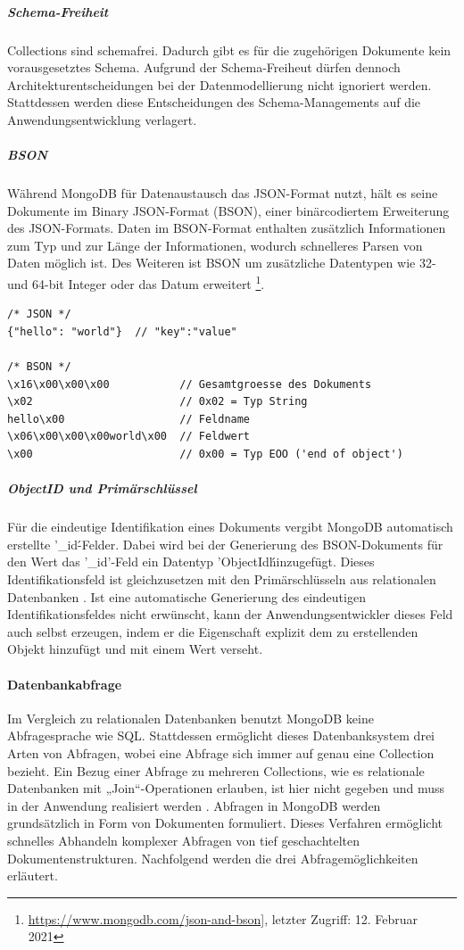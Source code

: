 \noindent
\subparagraph{Schema-Freiheit}
Collections sind schemafrei. Dadurch gibt es für die zugehörigen Dokumente kein vorausgesetztes Schema. Aufgrund der Schema-Freiheut dürfen dennoch Architekturentscheidungen bei der Datenmodellierung nicht ignoriert werden. Stattdessen werden diese Entscheidungen des Schema-Managements auf die Anwendungsentwicklung verlagert.
\newline

\noindent
\subparagraph{BSON}
Während MongoDB für Datenaustausch das JSON-Format nutzt, hält es seine Dokumente im Binary JSON-Format (BSON), einer binärcodiertem Erweiterung des JSON-Formats. Daten im BSON-Format enthalten zusätzlich Informationen zum Typ und zur Länge der Informationen, wodurch schnelleres Parsen von Daten möglich ist. Des Weiteren ist BSON um zusätzliche Datentypen wie 32- und 64-bit Integer oder das Datum erweitert \footnote{\url{https://www.mongodb.com/json-and-bson]}, letzter Zugriff: 12. Februar 2021}.
\newline

\begin{lstlisting}[caption=JSON - BSON Vergleich, label=lst:JSONBSON]
/* JSON */
{"hello": "world"}  // "key":"value"

/* BSON */
\x16\x00\x00\x00           // Gesamtgroesse des Dokuments
\x02                       // 0x02 = Typ String
hello\x00                  // Feldname
\x06\x00\x00\x00world\x00  // Feldwert
\x00                       // 0x00 = Typ EOO ('end of object')
\end{lstlisting}


\noindent
\subparagraph{ObjectID und Primärschlüssel}
Für die eindeutige Identifikation eines Dokuments vergibt MongoDB automatisch erstellte '\_id\'-Felder. Dabei wird bei der Generierung des BSON-Dokuments für den Wert das '\_id'-Feld ein Datentyp 'ObjectId\'  hinzugefügt. Dieses Identifikationsfeld ist gleichzusetzen mit den Primärschlüsseln aus relationalen Datenbanken \cite{DB1.85}. Ist eine automatische Generierung des eindeutigen Identifikationsfeldes nicht erwünscht, kann der Anwendungsentwickler dieses Feld auch selbst erzeugen, indem er die Eigenschaft explizit dem zu erstellenden Objekt hinzufügt und mit einem Wert verseht.
\newline

\paragraph{Datenbankabfrage}
Im Vergleich zu relationalen Datenbanken benutzt MongoDB keine Abfragesprache wie SQL. Stattdessen ermöglicht dieses Datenbanksystem drei Arten von Abfragen, wobei eine Abfrage sich immer auf genau eine Collection bezieht. Ein Bezug einer Abfrage zu mehreren Collections, wie es relationale Datenbanken mit „Join“-Operationen erlauben, ist hier nicht gegeben und muss in der Anwendung realisiert werden \cite{1.9}. Abfragen in MongoDB werden grundsätzlich in Form von Dokumenten formuliert. Dieses Verfahren ermöglicht schnelles Abhandeln komplexer Abfragen von tief geschachtelten Dokumentenstrukturen. Nachfolgend werden die drei Abfragemöglichkeiten erläutert.

